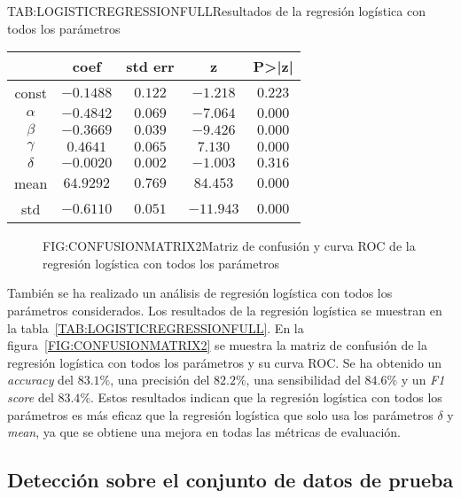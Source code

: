 \begin{table}[Resultados de la regresión logística con todos los parámetros]{TAB:LOGISTICREGRESSIONFULL}{Resultados de la regresión logística con todos los parámetros}
    \begin{tabular}{|c|c|c|c|c|}
        \hline
        & coef & std err & z & P>|z| \\
        \hline
        const & $-0.1488$ & $0.122$ & $-1.218$ & $0.223$ \\
        $\alpha$ & $-0.4842$ & $0.069$ & $-7.064$ & $0.000$ \\
        $\beta$ & $-0.3669$ & $0.039$ & $-9.426$ & $0.000$ \\
        $\gamma$ & $0.4641$ & $0.065$ & $7.130$ & $0.000$ \\
        $\delta$ & $-0.0020$ & $0.002$ & $-1.003$ & $0.316$ \\
        mean & $64.9292$ & $0.769$ & $84.453$ & $0.000$ \\
        std & $-0.6110$ & $0.051$ & $-11.943$ & $0.000$ \\
        \hline
    \end{tabular}
\end{table}

\begin{figure}[Matriz de confusión y curva ROC de la regresión logística con todos los parámetros]{FIG:CONFUSIONMATRIX2}{Matriz de confusión y curva ROC de la regresión logística con todos los parámetros}
     \quad
\end{figure}

También se ha realizado un análisis de regresión logística con todos los parámetros considerados. Los resultados de la regresión logística se muestran en la tabla~\ref{TAB:LOGISTICREGRESSIONFULL}.
En la figura~\ref{FIG:CONFUSIONMATRIX2} se muestra la matriz de confusión de la regresión logística con todos los parámetros y su curva \ac{ROC}. Se ha obtenido un \textit{accuracy} del $83.1\%$, una precisión del $82.2\%$, una sensibilidad del $84.6\%$ y un \textit{F1 score} del $83.4\%$. Estos resultados indican que la regresión logística con todos los parámetros es más eficaz que la regresión logística que solo usa los parámetros $\delta$ y \textit{mean}, ya que se obtiene una mejora en todas las métricas de evaluación.

\subsection{Detecci\'on sobre el conjunto de datos de prueba}\label{SUBSEC:DETECCIONDATASET}

